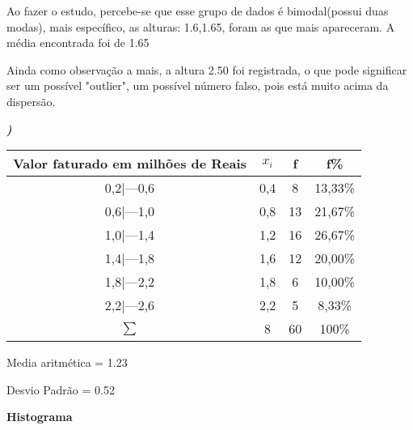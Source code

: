 \documentclass[12pt]{article}
\newcounter{instn}
\newcommand{\instnum}{\arabic{instn}}
\newcommand{\myline}[1]{
    \emph{\textbf{#1)}}
    \addtocounter{instn}{1}
}
\begin{document}
    Ao fazer o estudo, percebe-se que esse grupo de dados é bimodal(possui duas
    modas), mais específico, as alturas: 1.6,1.65, foram as que mais apareceram.
    A média encontrada foi de 1.65

    Ainda como observação a mais, a altura 2.50 foi registrada, o que pode significar ser um possível
    "outlier", um possível número falso, pois está muito acima da dispersão.


    \newpage
    \myline{\instnum}

    \begin{center}
        \begin{tabular}{|c | c | c | c |} 
        \hline
        Valor faturado em milhões de Reais & $x_i$ & f & f\% \\ [3pt]
        \hline
        0,2|---0,6 & 0,4 & 8 & 13,33\% \\ 
        \hline
        0,6|---1,0 & 0,8 & 13 & 21,67\% \\
        \hline
        1,0|---1,4 & 1,2 & 16 & 26,67\% \\
        \hline
        1,4|---1,8 & 1,6 & 12 & 20,00\% \\
        \hline
        1,8|---2,2 & 1,8 & 6 & 10,00\% \\ 
        \hline
        2,2|---2,6 & 2,2 & 5 & 8,33\% \\ 
        \hline
        $\sum$ & 8 & 60 & 100\% \\ [3pt]
        \hline
       \end{tabular}
    \end{center}

    Media aritmética = 1.23 

    Desvio Padrão = 0.52

    \begin{center}
        \large \textbf{Histograma}
    \end{center}
    \begin{center}
    \end{center}
\end{document}
